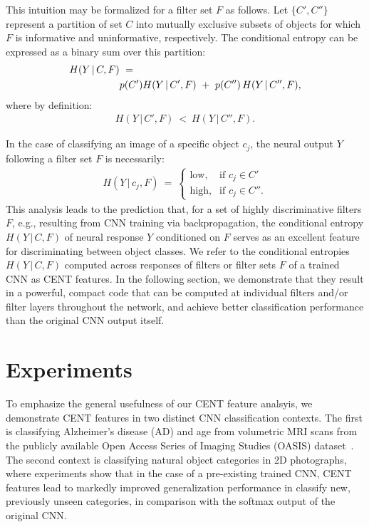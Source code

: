 \documentclass[10pt,onecolumn]{article}
\begin{document}
This intuition may be formalized for a filter set $F$ as follows. Let $\{C',C''\}$ represent a partition of set $C$ into mutually exclusive subsets of objects for which $F$ is informative and uninformative, respectively. The conditional entropy can be expressed as a binary sum over this partition:
\begin{align}
  H(Y\, | \,C,F) & \ = \ \\ \notag
  &p(C')H(Y\, | \,C',F) \ + \ p(C'') \, H(Y\, | \,C'',F),
\end{align}
where by definition:
\begin{align}
  H(Y\, | \,C',F) \ < \ H(Y\, | \,C'',F).
  \label{eq:entropy_difference}
\end{align}

In the case of classifying an image of a specific object $c_j$, the neural output $Y$ following a filter set $F$ is necessarily:
\begin{align}
   H(Y\, | \,c_j,F) \ = \
\begin{cases}
    \text{low},& \text{if } c_j \in C' \\
    \text{high},& \text{if } c_j \in C''.
\end{cases}
\end{align}
This analysis leads to the prediction that, for a set of highly discriminative filters $F$, e.g., resulting from CNN training via backpropagation, the conditional entropy $H(Y\, | \,C,F)$ of neural response $Y$ conditioned on $F$ serves as an excellent feature for discriminating between object classes. We refer to the conditional entropies $H(Y\, | \,C,F)$ computed across responses of filters or filter sets $F$ of a trained CNN as CENT features. In the following section, we demonstrate that they result in a powerful, compact code that can be computed at individual filters and/or filter layers throughout the network, and achieve better classification performance than the original CNN output itself.

\section{Experiments}

To emphasize the general usefulness of our CENT feature analsyis, we demonstrate CENT features in two distinct CNN classification contexts. The first is classifying Alzheimer's disease (AD) and age from volumetric MRI scans from the publicly available Open Access Series of Imaging Studies (OASIS) dataset~\cite{marcus2007open}. The second context is classifying natural object categories in 2D photographs, where experiments show that in the case of a pre-existing trained CNN, CENT features lead to markedly improved generalization performance in classify new, previously unseen categories, in comparison with the softmax output of the original CNN.
\end{document}
